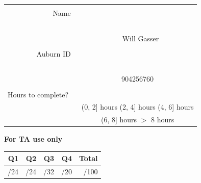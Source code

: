 \documentclass[twoside]{article}
\newcommand{\emptycircle}{$\Large\bigcirc$}
\newcommand{\filledcircle}{$\Large\newmoon$}
\def\Name {Will Gasser}  %
\def\AuburnID{904256760} %
\def\TwoHours{    
    \emptycircle
}
\def\FourHours{    
    \filledcircle
}
\def\SixHours{    
    \emptycircle
}
\def\EightHours{    
    \emptycircle
}
\def\MoreThanEightHours{    
    \emptycircle
}
\begin{document}
\begin{center}
\begin{tabular}{|r|c|}
\hline
\begin{minipage}{3cm}~\\Name~\\~\\\end{minipage} & \begin{minipage}[c][1cm][c]{8cm} ~ \Name \end{minipage}  \\
\hline
\begin{minipage}{3cm}~\\Auburn ID~\\~\\\end{minipage} & \AuburnID \\
\hline
\begin{minipage}{3cm}~\\Hours to complete? ~\\\end{minipage} & \solution{\emptycircle}{\TwoHours} (0, 2] hours \hspace{0.5cm} \solution{\emptycircle}{\FourHours} (2, 4] hours \hspace{0.5cm}
\solution{\emptycircle}{\SixHours} (4, 6] hours \hspace{0.5cm} \\
&
\solution{\emptycircle}{\EightHours} (6, 8] hours \hspace{0.5cm}
\solution{\emptycircle}{\MoreThanEightHours} $>$ 8 hours \\
\hline

\end{tabular}
\end{center}



\vfill

\smallskip
\smallskip
\smallskip
\smallskip
\smallskip

\begin{center}
{\bf For TA use only}\\
\begin{Large}
\begin{tabular}{|r|r|r|r|r|}
\hline
Q1 & Q2 & Q3 & Q4 & Total \\
\hline
\quad/24 & \quad/24 &\quad/32 & \quad/20    & \quad/100 \\
\hline
\end{tabular}\end{Large}
\end{center}
\end{document}
